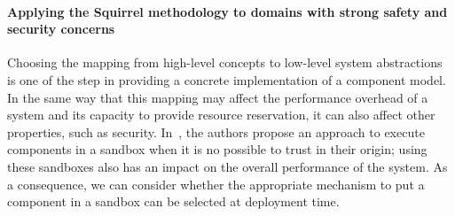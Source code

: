 \paragraph{Applying the Squirrel methodology to domains with strong safety and security concerns}


Choosing the mapping from high-level concepts to low-level system abstractions is one of the step in providing a concrete implementation of a component model.
In the same way that this mapping may affect the performance overhead of a system and its capacity to provide resource reservation, it can also affect other properties, such as security.
In~\cite{Gama:2010:SCS:2176905.2176915}, the authors propose an approach to execute components in a sandbox when it is no possible to trust in their origin; using these sandboxes  also has an impact on the overall performance of the system.
As a consequence, we can consider whether the appropriate mechanism to put a component in a sandbox can be selected at deployment time.








